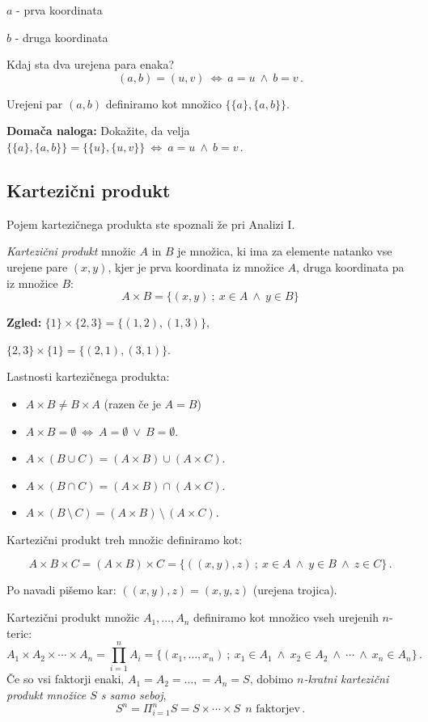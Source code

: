 \documentclass[11pt,paper=b5,footinclude,headinclude]{scrbook} %
\def\ali {{~\vee~}}
\def\inn {{~\wedge~}}
\def\brez {{\,\setminus\,}}
\def\cee {{~\Leftrightarrow~}}
\begin{document}
$a$ - prva koordinata

$b$ - druga koordinata

Kdaj sta dva urejena para enaka?
$$(a,b) = (u,v) \cee a = u \inn b = v\,.$$

\medskip
Urejeni par $(a,b)$ definiramo kot množico $\{\{a\},\{a,b\}\}$.

\medskip
\textbf{ Domača naloga:}
Dokažite, da velja $\{\{a\},\{a,b\}\} = \{\{u\},\{u,v\}\}\cee a = u \inn b = v\,.$



\subsection{Kartezični produkt}

Pojem kartezičnega produkta ste spoznali že pri Analizi I.

{\em Kartezični produkt} množic $A$ in $B$ je množica, ki ima za elemente natanko vse urejene pare $(x,y)$, kjer je prva koordinata iz množice $A$, druga koordinata pa iz množice $B$:
$$A\times B = \{(x,y)~;~x\in A\inn y\in B\}$$



\textbf{ Zgled:} $\{1\}\times \{2,3\} = \{(1,2),(1,3)\}$,

$\{2,3\}\times \{1\} = \{(2,1),(3,1)\}$.

\bigskip
Lastnosti kartezičnega produkta:
\begin{itemize}
  \item $A\times B\neq B\times A$ (razen če je $A = B$)
  \item $A\times B = \emptyset \cee A= \emptyset \ali B = \emptyset$.
  \item $A\times (B\cup C) = (A\times B) \cup (A\times C)$.
  \item $A\times (B\cap C) = (A\times B) \cap (A\times C)$.
  \item $A\times (B\brez C) = (A\times B) \brez (A\times C)$.
\end{itemize}

Kartezični produkt treh množic definiramo kot:

$$A\times B\times C = (A\times B)\times C= \{((x,y),z)~;~x\in A \inn y\in B\inn z\in C\}\,.$$

Po navadi pišemo kar: $((x,y),z) = (x,y,z)$ (urejena trojica).

\bigskip
Kartezični produkt množic $A_1,\ldots, A_n$ definiramo kot
množico vseh urejenih $n$-teric:
$$A_1\times A_2\times\cdots \times A_n = \prod_{i = 1}^n A_i = \{(x_1,\ldots, x_n)~;~x_1\in A_1\inn x_2\in A_2\inn\cdots \inn x_n\in A_n\}\,.$$
Če so vsi faktorji enaki, $A_1 = A_2 = \ldots,  = A_n = S$, dobimo {\em $n$-kratni kartezični produkt množice $S$ s samo seboj},
$$S^n = \Pi_{i = 1}^nS = S\times\cdots\times S~~\textrm{$n$ faktorjev}\,.$$
\end{document}
